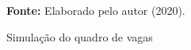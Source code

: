 \begin{figure}[ht!]
\centering

\caption{\textmd{Simulação do quadro de vagas}}
\label{fig:quadrosimulacao}

\par\medskip\textbf{Fonte:} Elaborado pelo autor (2020). \par\medskip

\end{figure}

